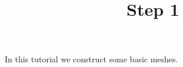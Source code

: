 \documentclass{../notes}
\title{Step 1}
\begin{document}
\maketitle

In this tutorial we construct some basic meshes.
\end{document}
